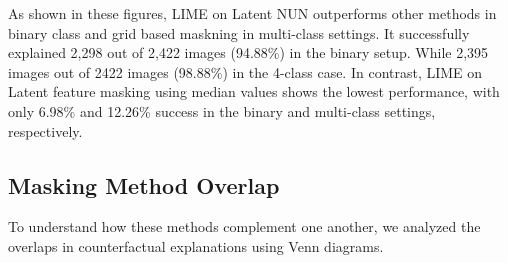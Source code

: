 As shown in these figures, LIME on Latent NUN outperforms other methods in binary class and grid based maskning in multi-class settings. It successfully explained 2,298 out of 2,422 images (94.88\%) in the binary setup. While 2,395 images out of 2422 images (98.88\%) in the 4-class case. In contrast, LIME on Latent feature masking using median values shows the lowest performance, with only 6.98\% and 12.26\% success in the binary and multi-class settings, respectively.

\subsection{Masking Method Overlap} \label{subsubsec:masking_method_overlap}
To understand how these methods complement one another, we analyzed the overlaps in counterfactual explanations using Venn diagrams.

